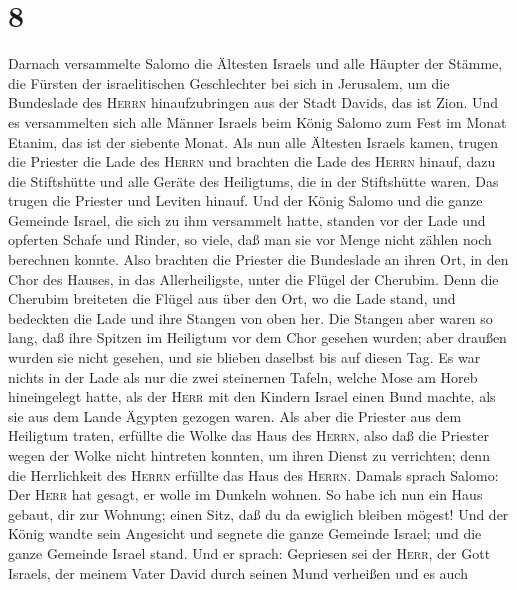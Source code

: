 \hypertarget{section-7}{%
\section{8}\label{section-7}}

 Darnach versammelte Salomo die Ältesten Israels und alle
Häupter der Stämme, die Fürsten der israelitischen Geschlechter bei sich
in Jerusalem, um die Bundeslade des \textsc{Herrn} hinaufzubringen aus
der Stadt Davids, das ist Zion.  Und es versammelten sich
alle Männer Israels beim König Salomo zum Fest im Monat Etanim, das ist
der siebente Monat.  Als nun alle Ältesten Israels kamen,
trugen die Priester die Lade des \textsc{Herrn}  und
brachten die Lade des \textsc{Herrn} hinauf, dazu die Stiftshütte und
alle Geräte des Heiligtums, die in der Stiftshütte waren. Das trugen die
Priester und Leviten hinauf.  Und der König Salomo und die
ganze Gemeinde Israel, die sich zu ihm versammelt hatte, standen vor der
Lade und opferten Schafe und Rinder, so viele, daß man sie vor Menge
nicht zählen noch berechnen konnte.  Also brachten die
Priester die Bundeslade an ihren Ort, in den Chor des Hauses, in das
Allerheiligste, unter die Flügel der Cherubim.  Denn die
Cherubim breiteten die Flügel aus über den Ort, wo die Lade stand, und
bedeckten die Lade und ihre Stangen von oben her.  Die
Stangen aber waren so lang, daß ihre Spitzen im Heiligtum vor dem Chor
gesehen wurden; aber draußen wurden sie nicht gesehen, und sie blieben
daselbst bis auf diesen Tag.  Es war nichts in der Lade
als nur die zwei steinernen Tafeln, welche Mose am Horeb hineingelegt
hatte, als der \textsc{Herr} mit den Kindern Israel einen Bund machte,
als sie aus dem Lande Ägypten gezogen waren.  Als aber
die Priester aus dem Heiligtum traten, erfüllte die Wolke das Haus des
\textsc{Herrn},  also daß die Priester wegen der Wolke
nicht hintreten konnten, um ihren Dienst zu verrichten; denn die
Herrlichkeit des \textsc{Herrn} erfüllte das Haus des \textsc{Herrn}.
 Damals sprach Salomo: Der \textsc{Herr} hat gesagt, er
wolle im Dunkeln wohnen.  So habe ich nun ein Haus
gebaut, dir zur Wohnung; einen Sitz, daß du da ewiglich bleiben mögest!
 Und der König wandte sein Angesicht und segnete die
ganze Gemeinde Israel; und die ganze Gemeinde Israel stand.
 Und er sprach: Gepriesen sei der \textsc{Herr}, der Gott
Israels, der meinem Vater David durch seinen Mund verheißen und es auch
